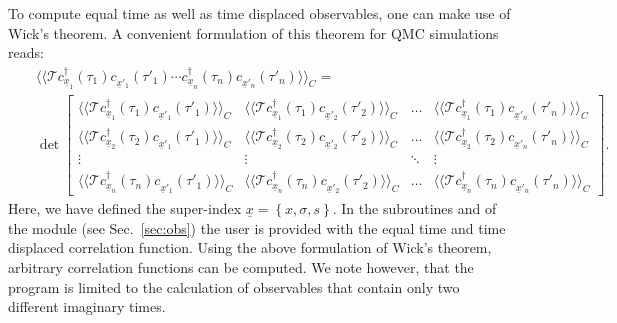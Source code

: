 \documentclass{SciPost}
\begin{document}
To compute equal time as well as time displaced observables,  one can make use of Wick's theorem. A convenient formulation of this theorem for  QMC simulations reads: 
\begin{eqnarray}
& & \langle \langle 	\mathcal{T}   c^{\dagger}_{\underline x_{1}}(\tau_{1}) c^{\phantom\dagger}_{{\underline x}'_{1}}(\tau'_{1})  
\cdots c^{\dagger}_{\underline x_{n}}(\tau_{n}) c^{\phantom\dagger}_{{\underline x}'_{n}}(\tau'_{n}) 
\rangle \rangle_{C} =
\nonumber \\ & & \det  
\begin{bmatrix}
   \langle \langle   \mathcal{T}   c^{\dagger}_{\underline x_{1}}(\tau_{1}) c^{\phantom\dagger}_{{\underline x}'_{1}}(\tau'_{1})  \rangle \rangle_{C} & 
    \langle \langle  \mathcal{T}   c^{\dagger}_{\underline x_{1}}(\tau_{1}) c^{\phantom\dagger}_{{\underline x}'_{2}}(\tau'_{2})  \rangle \rangle_{C}  & \dots   &   
    \langle \langle   \mathcal{T}   c^{\dagger}_{\underline x_{1}}(\tau_{1}) c^{\phantom\dagger}_{{\underline x}'_{n}}(\tau'_{n})  \rangle \rangle_{C}  \\
    \langle \langle   \mathcal{T}   c^{\dagger}_{\underline x_{2}}(\tau_{2}) c^{\phantom\dagger}_{{\underline x}'_{1}}(\tau'_{1})  \rangle \rangle_{C}  & 
      \langle \langle   \mathcal{T}   c^{\dagger}_{\underline x_{2}}(\tau_{2}) c^{\phantom\dagger}_{{\underline x}'_{2}}(\tau'_{2})  \rangle \rangle_{C}  & \dots  &
       \langle \langle   \mathcal{T}   c^{\dagger}_{\underline x_{2}}(\tau_{2}) c^{\phantom\dagger}_{{\underline x}'_{n}}(\tau'_{n})  \rangle \rangle_{C}   \\
    \vdots & \vdots &  \ddots & \vdots \\
    \langle \langle   \mathcal{T}   c^{\dagger}_{\underline x_{n}}(\tau_{n}) c^{\phantom\dagger}_{{\underline x}'_{1}}(\tau'_{1})  \rangle \rangle_{C}   & 
     \langle \langle   \mathcal{T}   c^{\dagger}_{\underline x_{n}}(\tau_{n}) c^{\phantom\dagger}_{{\underline x}'_{2}}(\tau'_{2})  \rangle \rangle_{C}   & \dots  & 
     \langle \langle   \mathcal{T}   c^{\dagger}_{\underline x_{n}}(\tau_{n}) c^{\phantom\dagger}_{{\underline x}'_{n}}(\tau'_{n})  \rangle \rangle_{C}
 \end{bmatrix}.
\end{eqnarray}
Here, we have defined the super-index $\underline{ x} = \left\{   x,\sigma,s \right\}$.
In the subroutines     and  of  the module  (see Sec.~\ref{sec:obs})   the user is provided with the equal time and time displaced correlation function. Using the  above  formulation  of  Wick's theorem, arbitrary  correlation functions can be computed. We note however, that the program is limited to the calculation of observables that contain only two different imaginary times.  
%
\end{document}
